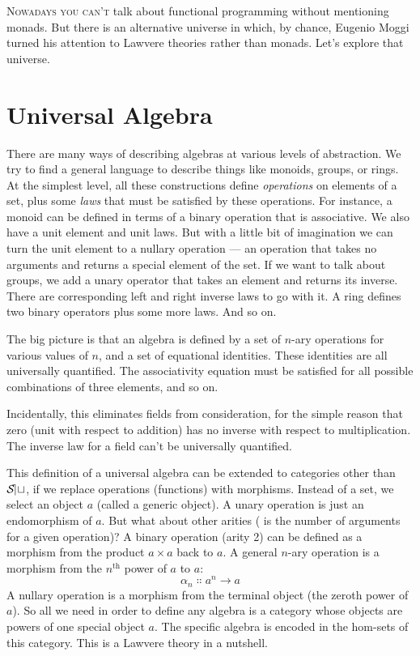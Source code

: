 
\lettrine[lhang=0.17]{N}{owadays you can't} talk about functional programming without mentioning
monads. But there is an alternative universe in which, by chance,
Eugenio Moggi turned his attention to Lawvere theories rather than
monads. Let's explore that universe.

\section{Universal Algebra}

There are many ways of describing algebras at various levels of
abstraction. We try to find a general language to describe things like
monoids, groups, or rings. At the simplest level, all these
constructions define \emph{operations} on elements of a set, plus some
\emph{laws} that must be satisfied by these operations. For instance, a
monoid can be defined in terms of a binary operation that is
associative. We also have a unit element and unit laws. But with a
little bit of imagination we can turn the unit element to a nullary
operation --- an operation that takes no arguments and returns a special
element of the set. If we want to talk about groups, we add a unary
operator that takes an element and returns its inverse. There are
corresponding left and right inverse laws to go with it. A ring defines
two binary operators plus some more laws. And so on.

The big picture is that an algebra is defined by a set of $n$-ary
operations for various values of $n$, and a set of equational identities.
These identities are all universally quantified. The associativity
equation must be satisfied for all possible combinations of three
elements, and so on.

Incidentally, this eliminates fields from consideration, for the simple
reason that zero (unit with respect to addition) has no inverse with
respect to multiplication. The inverse law for a field can't be
universally quantified.

This definition of a universal algebra can be extended to categories
other than $\mathcal{S\mkern-3mu et}$, if we replace operations (functions) with
morphisms. Instead of a set, we select an object $a$ (called a
generic object). A unary operation is just an endomorphism of
$a$. But what about other arities ( is the number of
arguments for a given operation)? A binary operation (arity 2) can be
defined as a morphism from the product $a\times{}a$ back to $a$.
A general $n$-ary operation is a morphism from the $n^\text{th}$ power of
$a$ to $a$:
\[\alpha_n \Colon a^n \to a\]
A nullary operation is a morphism from the terminal object (the zeroth
power of $a$). So all we need in order to define any algebra is a
category whose objects are powers of one special object $a$. The
specific algebra is encoded in the hom-sets of this category. This is a
Lawvere theory in a nutshell.

